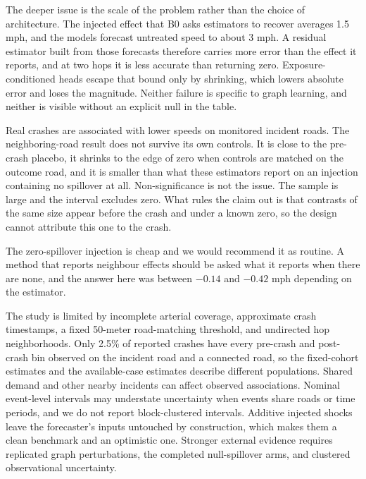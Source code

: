 \documentclass[sigconf,nonacm]{acmart}
\begin{document}
The deeper issue is the scale of the problem rather than the choice of architecture. The injected effect that B0 asks estimators to recover averages 1.5 mph, and the models forecast untreated speed to about 3 mph. A residual estimator built from those forecasts therefore carries more error than the effect it reports, and at two hops it is less accurate than returning zero. Exposure-conditioned heads escape that bound only by shrinking, which lowers absolute error and loses the magnitude. Neither failure is specific to graph learning, and neither is visible without an explicit null in the table.

Real crashes are associated with lower speeds on monitored incident roads. The neighboring-road result does not survive its own controls. It is close to the pre-crash placebo, it shrinks to the edge of zero when controls are matched on the outcome road, and it is smaller than what these estimators report on an injection containing no spillover at all. Non-significance is not the issue. The sample is large and the interval excludes zero. What rules the claim out is that contrasts of the same size appear before the crash and under a known zero, so the design cannot attribute this one to the crash.

The zero-spillover injection is cheap and we would recommend it as routine. A method that reports neighbour effects should be asked what it reports when there are none, and the answer here was between $-0.14$ and $-0.42$ mph depending on the estimator.

The study is limited by incomplete arterial coverage, approximate crash timestamps, a fixed 50-meter road-matching threshold, and undirected hop neighborhoods. Only 2.5\% of reported crashes have every pre-crash and post-crash bin observed on the incident road and a connected road, so the fixed-cohort estimates and the available-case estimates describe different populations. Shared demand and other nearby incidents can affect observed associations. Nominal event-level intervals may understate uncertainty when events share roads or time periods, and we do not report block-clustered intervals. Additive injected shocks leave the forecaster's inputs untouched by construction, which makes them a clean benchmark and an optimistic one. Stronger external evidence requires replicated graph perturbations, the completed null-spillover arms, and clustered observational uncertainty.
\end{document}
